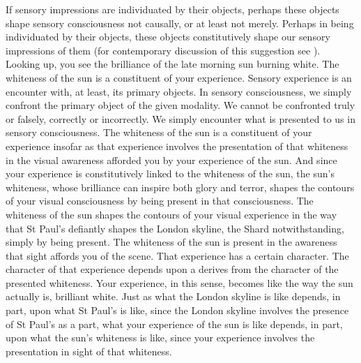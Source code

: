 If sensory impressions are individuated by their objects, perhaps these objects shape sensory consciousness not causally, or at least not merely. Perhaps in being individuated by their objects, these objects constitutively shape our sensory impressions of them (for contemporary discussion of this suggestion see \citealt{McDowell:1998vn,Martin:2004fj,Fish:2009fk,Kalderon:2011fk}). Looking up, you see the brilliance of the late morning sun burning white. The whiteness of the sun is a constituent of your experience. Sensory experience is an encounter with, at least, its primary objects. In sensory consciousness, we simply confront the primary object of the given modality. We cannot be confronted truly or falsely, correctly or incorrectly. We simply encounter what is presented to us in sensory consciousness. The whiteness of the sun is a constituent of your experience insofar as that experience involves the presentation of that whiteness in the visual awareness afforded you by your experience of the sun. And since your experience is constitutively linked to the whiteness of the sun, the sun's whiteness, whose brilliance can inspire both glory and terror, shapes the contours of your visual consciousness by being present in that consciousness. The whiteness of the sun shapes the contours of your visual experience in the way that St Paul's defiantly shapes the London skyline, the Shard notwithstanding, simply by being present. The whiteness of the sun is present in the awareness that sight affords you of the scene. That experience has a certain character. The character of that experience depends upon a derives from the character of the presented whiteness. Your experience, in this sense, becomes like the way the sun actually is, brilliant white. Just as what the London skyline is like depends, in part, upon what St Paul's is like, since the London skyline involves the presence of St Paul's as a part, what your experience of the sun is like depends, in part, upon what the sun's whiteness is like, since your experience involves the presentation in sight of that whiteness.

